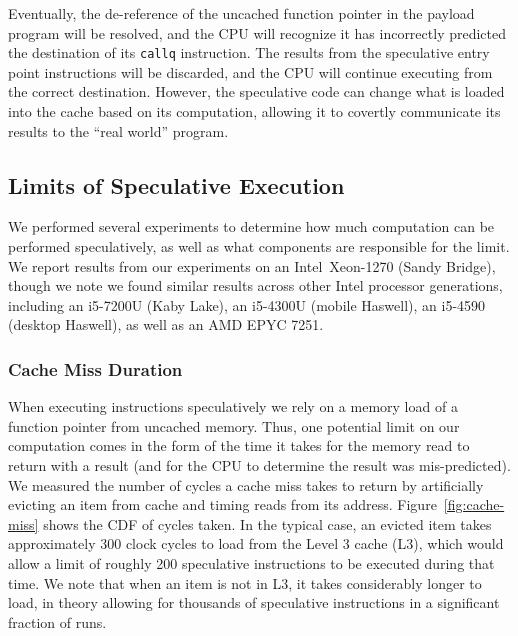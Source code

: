 Eventually, the de-reference of the uncached function pointer in the payload
program will be resolved, and the CPU will recognize it has incorrectly
predicted the destination of its \texttt{callq} instruction. The results from
the speculative entry point instructions will be discarded, and the CPU will
continue executing from the correct destination. However, the speculative code
can change what is loaded into the cache based on its computation, allowing it
to covertly communicate its results to the ``real world'' program.



\subsection{Limits of Speculative Execution}

\FigCacheMiss

\FigSpecMeasureNP

We performed several experiments to determine how much computation can be
performed
speculatively, as well as what components are responsible for the limit.
We report results from our experiments on an Intel~Xeon-1270 (Sandy Bridge),
though we note we found similar results across other Intel processor generations,
including an i5-7200U (Kaby Lake), %
an i5-4300U (mobile Haswell), %
an i5-4590 (desktop Haswell), %
as well as an AMD EPYC 7251. %



\subsubsection{Cache Miss Duration}
When executing instructions speculatively we rely on a memory load of a function
pointer from uncached memory. Thus, one potential limit on our computation comes
in the form of the time it takes for the memory read to return with a result
(and for the CPU to determine the result was mis-predicted).
We measured the number of cycles a
cache miss takes to return by artificially evicting an item from cache and
timing reads from its address.
Figure~\ref{fig:cache-miss} shows the CDF of cycles taken. In the typical case,
an evicted item takes approximately 300 clock cycles to load from the Level 3 cache (L3), which
would allow a limit of roughly 200 speculative instructions to be
executed during that time. We note that when an item is not in L3, it takes
considerably longer to load, in theory allowing for thousands of speculative
instructions in a significant fraction of runs.


